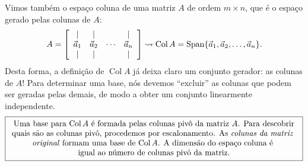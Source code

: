 Vimos também o espaço coluna de uma matriz $A$ de ordem $m \times n$, que é o espaço gerado pelas colunas de $A$:
\begin{equation}
A =
\left[
\begin{array}{cccc}
| & | &  & | \\
\vec{a}_1 & \vec{a}_2 & \cdots & \vec{a}_n \\
| & | &        & | \\
\end{array}
\right] \rightsquigarrow
\operatorname{Col} A = \operatorname{Span} \{ \vec{a}_1, \vec{a}_2, \dots, \vec{a}_n\}.
\end{equation} Desta forma, a definição de $\operatorname{Col} A$ já deixa claro um conjunto gerador: as colunas de $A$! Para determinar uma base, nós devemos ``excluir'' as colunas que podem ser geradas pelas demais, de modo a obter um conjunto linearmente independente.
\begin{equation}
\boxed{
	\begin{array}{c}
	\text{Uma base para $\operatorname{Col} A$ é formada pelas colunas pivô da matriz $A$. Para descobrir} \\
	\text{quais são as colunas pivô, procedemos por escalonamento. As \textit{colunas da matriz} } \\
	\text{\textit{original} formam uma base de $\operatorname{Col} A$. A dimensão do espaço coluna é } \\
	\text{igual ao número de colunas pivô da matriz.}
	\end{array}
}
\end{equation}


